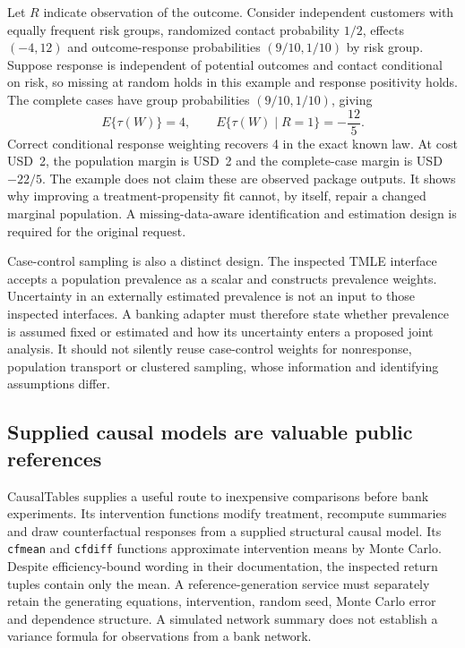 Let $R$ indicate observation of the outcome. Consider independent customers
with equally frequent risk groups, randomized contact probability $1/2$,
effects $(-4,12)$ and outcome-response probabilities $(9/10,1/10)$ by risk
group. Suppose response is independent of potential outcomes and contact
conditional on risk, so missing at random holds in this example and response
positivity holds. The complete cases have group probabilities $(9/10,1/10)$,
giving
\begin{equation}
\label{exec21:effects-response}
 E\{\tau(W)\}=4,\qquad
 E\{\tau(W)\mid R=1\}=-\frac{12}{5}.
\end{equation}
Correct conditional response weighting recovers 4 in the exact known law.
At cost USD~2, the population margin is USD~2 and the complete-case margin
is USD~$-22/5$. The example does not claim these are observed package
outputs. It shows why improving a treatment-propensity fit cannot, by
itself, repair a changed marginal population. A missing-data-aware
identification and estimation design is required for the original request.
\cite{exec21_effects_reference}

Case-control sampling is also a distinct design. The inspected TMLE
interface accepts a population prevalence as a scalar and constructs
prevalence weights. Uncertainty in an externally estimated prevalence is
not an input to those inspected interfaces. A banking adapter must therefore
state whether prevalence is assumed fixed or estimated and how its
uncertainty enters a proposed joint analysis. It should not silently reuse
case-control weights for nonresponse, population transport or clustered
sampling, whose information and identifying assumptions differ.
\cite{exec21_effects_tmle}

\subsection{Supplied causal models are valuable public references}
\label{exec21:effects-scm}

CausalTables supplies a useful route to inexpensive comparisons before bank
experiments. Its intervention functions modify treatment, recompute
summaries and draw counterfactual responses from a supplied structural
causal model. Its \texttt{cfmean} and \texttt{cfdiff} functions approximate
intervention means by Monte Carlo. Despite efficiency-bound wording in
their documentation, the inspected return tuples contain only the mean.
A reference-generation service must separately retain the generating
equations, intervention, random seed, Monte Carlo error and dependence
structure. A simulated network summary does not establish a variance formula
for observations from a bank network. \cite{exec21_effects_causaltables}

